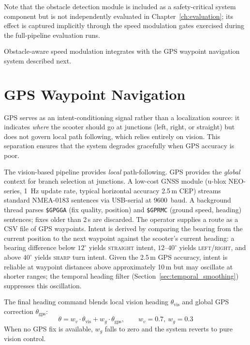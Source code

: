 \documentclass[12pt,letterpaper,oneside]{report}
\begin{document}
Note that the obstacle detection module is included as a safety-critical system component but is not independently evaluated in Chapter~\ref{ch:evaluation}; its effect is captured implicitly through the speed modulation gates exercised during the full-pipeline evaluation runs.

Obstacle-aware speed modulation integrates with the GPS waypoint navigation system described next.


\section{GPS Waypoint Navigation}
\label{sec:gps_navigation}

GPS serves as an intent-conditioning signal rather than a localization source: it indicates \emph{where} the scooter should go at junctions (left, right, or straight) but does not govern local path following, which relies entirely on vision. This separation ensures that the system degrades gracefully when GPS accuracy is poor.

The vision-based pipeline provides \emph{local} path-following. GPS provides the \emph{global} context for branch selection at junctions. A low-cost GNSS module (u-blox NEO-series, 1~Hz update rate, typical horizontal accuracy 2.5\,m CEP) streams standard NMEA-0183 sentences via USB-serial at 9600~baud. A background thread parses \texttt{\$GPGGA} (fix quality, position) and \texttt{\$GPRMC} (ground speed, heading) sentences; fixes older than 2\,s are discarded. The operator supplies a route as a CSV file of GPS waypoints. Intent is derived by comparing the bearing from the current position to the next waypoint against the scooter's current heading: a bearing difference below $12^\circ$ yields \textsc{straight} intent, $12$--$40^\circ$ yields \textsc{left}/\textsc{right}, and above $40^\circ$ yields \textsc{sharp} turn intent.  Given the 2.5\,m GPS accuracy, intent is reliable at waypoint distances above approximately 10\,m but may oscillate at shorter ranges; the temporal heading filter (Section~\ref{sec:temporal_smoothing}) suppresses this oscillation.

The final heading command blends local vision heading $\theta_\text{vis}$ and global GPS correction $\theta_\text{gps}$:
\begin{equation}
\theta = w_v \cdot \theta_{\text{vis}} + w_g \cdot \theta_{\text{gps}}, \qquad w_v = 0.7,\ w_g = 0.3
\end{equation}
When no GPS fix is available, $w_g$ falls to zero and the system reverts to pure vision control.
\end{document}
